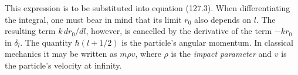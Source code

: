 This expression is to be substituted into equation (127.3). When differentiating the integral, one must bear in mind that its limit $r_0$ also depends on $l$. The resulting term $k\,dr_0/dl$, however, is cancelled by the derivative of the term $-kr_0$ in $\delta_l$. The quantity $\hbar(l+1/2)$ is the particle's angular momentum. In classical mechanics it may be written as $m\rho v$, where $\rho$ is the \emph{impact parameter} and $v$ is the particle's velocity at infinity.

